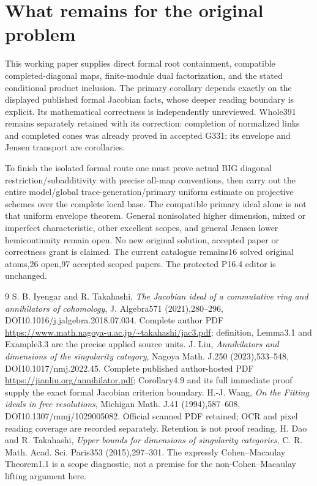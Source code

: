 \documentclass[11pt]{article}
\begin{document}
\section{What remains for the original problem}
This working paper supplies direct formal root containment, compatible
completed-diagonal maps, finite-module dual factorization, and the stated
conditional product inclusion. The primary corollary depends exactly on
the displayed published formal Jacobian facts, whose deeper reading
boundary is explicit. Its mathematical correctness is independently
unreviewed. Whole391 remains separately retained with its correction:
completion of normalized links and completed cones was already proved
in accepted G331; its envelope and Jensen transport are corollaries.

To finish the isolated formal route one must prove actual BIG diagonal
restriction/subadditivity with precise all-map conventions, then carry
out the entire model/global trace-generation/primary uniform estimate
on projective schemes over the complete local base. The compatible
primary ideal alone is not that uniform envelope theorem. General
nonisolated higher dimension, mixed or imperfect characteristic, other
excellent scopes, and general Jensen lower hemicontinuity remain open.
No new original solution, accepted paper or correctness grant is claimed.
The current catalogue remains16 solved original atoms,26 open,97 accepted
scoped papers. The protected P16.4 editor is unchanged.

\begin{thebibliography}{9}
 S. B. Iyengar and R. Takahashi,
\emph{The Jacobian ideal of a commutative ring and annihilators of
cohomology}, J. Algebra571 (2021),280--296,
DOI10.1016/j.jalgebra.2018.07.034. Complete author PDF
\url{https://www.math.nagoya-u.ac.jp/~takahashi/jac3.pdf}; definition,
Lemma3.1 and Example3.3 are the precise applied source units.
 J. Liu, \emph{Annihilators and dimensions of the singularity
category}, Nagoya Math. J.250 (2023),533--548,
DOI10.1017/nmj.2022.45. Complete published author-hosted PDF
\url{https://jianliu.org/annihilator.pdf}; Corollary4.9 and its full
immediate proof supply the exact formal Jacobian criterion boundary.
 H.-J. Wang, \emph{On the Fitting ideals in free resolutions},
Michigan Math. J.41 (1994),587--608,
DOI10.1307/mmj/1029005082. Official scanned PDF retained; OCR and pixel
reading coverage are recorded separately. Retention is not proof reading.
 H. Dao and R. Takahashi, \emph{Upper bounds for dimensions of
singularity categories}, C. R. Math. Acad. Sci. Paris353 (2015),297--301.
The expressly Cohen--Macaulay Theorem1.1 is a scope diagnostic, not a
premise for the non-Cohen--Macaulay lifting argument here.
\end{thebibliography}
\end{document}

